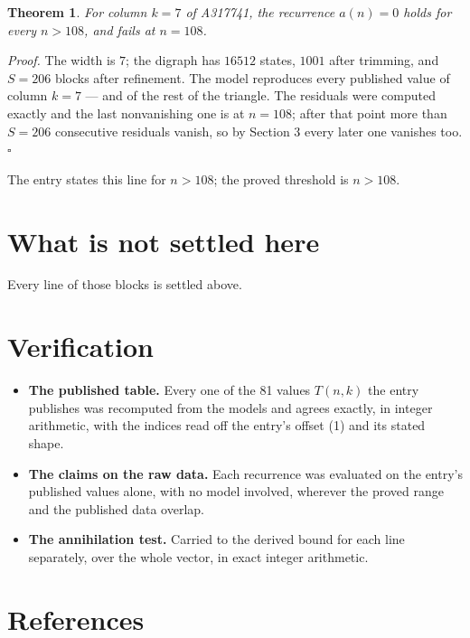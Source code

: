 \documentclass[11pt]{article}
\newtheorem{theorem}{Theorem}
\theoremstyle{definition}
\begin{document}
\begin{theorem} For column $k = 7$ of A317741, the recurrence $a(n) = 0$ holds for every $n > 108$, and fails at $n = 108$.\end{theorem}

{\itshape Proof.} The width is $7$; the digraph has $16512$ states, $1001$ after trimming, and $S = 206$ blocks after refinement. The model reproduces every published value of column $k = 7$ --- and of the rest of the triangle. The residuals were computed exactly and the last nonvanishing one is at $n = 108$; after that point more than $S = 206$ consecutive residuals vanish, so by Section 3 every later one vanishes too. $\square$

The entry states this line for $n > 108$; the proved threshold is $n > 108$.

\section{What is not settled here}

Every line of those blocks is settled above.

\section{Verification}

\begin{itemize}

\item {\bfseries The published table.} Every one of the 81 values $T(n,k)$ the entry publishes was recomputed from the models and agrees exactly, in integer arithmetic, with the indices read off the entry's offset (1) and its stated shape.

\item {\bfseries The claims on the raw data.} Each recurrence was evaluated on the entry's published values alone, with no model involved, wherever the proved range and the published data overlap.

\item {\bfseries The annihilation test.} Carried to the derived bound for each line separately, over the whole vector, in exact integer arithmetic.

\end{itemize}

\section{References}
\end{document}

